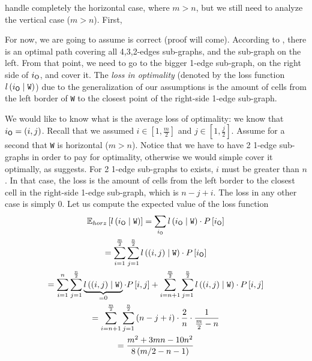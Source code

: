 \documentclass[a4paper,11pt]{article}
\theoremstyle{definition}
\newcommand{\opp}{{{\sf O}}\xspace}
\newcommand{\io}{{\ensuremath{i_{\opp}}}\xspace}
\newcommand{\w}{{{\texttt W}}\xspace}
\newcommand{\ltr}{{{\sf{LTR}}}\xspace}
\begin{document}
 handle completely the horizontal case, where $m>n$, but we still need to analyze the vertical case ($m>n$).
First, 




    


For now, we are going to assume  is correct (proof will come). According to , there is an optimal path covering all 4,3,2-edges sub-graphs, and the sub-graph on the left. From that point, we need to go to the bigger 1-edge sub-graph, on the right side of \io, and cover it.
The \emph{loss in optimality} (denoted by the loss function $l\left(\io\mid \w\right)$) due to the generalization of our assumptions is the amount of cells from the left border of \w to the closest point of the right-side 1-edge sub-graph.

We would like to know what is the average loss of optimality:
we know that $\io=\left(i,j\right)$. Recall that we assumed $i\in\left[1,\frac{m}{2}\right]$ and $j\in\left[1,\frac{j}{2}\right]$.
Assume for a second that \w is horizontal ($m>n$). Notice that we have to have 2 1-edge sub-graphs in order to pay for optimality, otherwise we would simple cover it optimally, as  suggests. For 2 1-edge sub-graphs to exists, $i$ must be greater than $n$. In that case, the loss is the amount of cells from the left border to the closest cell in the right-side 1-edge sub-graph, which is $n-j+i$.
The loss in any other case is simply 0.
Let us compute the expected value of the loss function
\begin{multline}
    \mathbb{E}_{horz}\left[l\left(\io\mid \w\right)\right]=\sum_{\io}{l\left(\io\mid \w\right)\cdot P\left[\io\right]}
    \\=\sum_{i=1}^{\frac{m}{2}}\sum_{j=1}^{\frac{n}{2}}{l\left(\left(i,j\right)\mid \w\right)\cdot P\left[\io\right]}
    \\=\sum_{i=1}^{n}\sum_{j=1}^{\frac{n}{2}}{\underbrace{l\left(\left(i,j\right)\mid \w\right)}_{=0}\cdot P\left[i,j\right]}+\sum_{i=n+1}^{\frac{m}{2}}\sum_{j=1}^{\frac{n}{2}}{l\left(\left(i,j\right)\mid \w\right)\cdot P\left[i,j\right]}
    \\=\sum_{i=n+1}^{\frac{m}{2}}\sum_{j=1}^{\frac{n}{2}}{\left(n-j+i\right)\cdot \frac{2}{n}\cdot \frac{1}{\frac{m}{2}-n}}
    \\=\frac{m^2 + 3 m n - 10 n^2}{8 \left(m/2 - n - 1\right)}
\end{multline}
\end{document}
